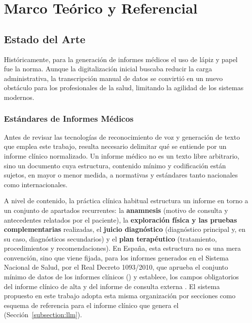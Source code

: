 \chapter{Marco Teórico y Referencial}\label{chapter:marco_teorico_y_referencial}

\section{Estado del Arte}

Históricamente, para la generación de informes médicos el uso de lápiz y papel fue la norma.
Aunque la digitalización inicial buscaba reducir la carga administrativa,
la transcripción manual de datos se convirtió en un nuevo obstáculo para los profesionales de la salud,
limitando la agilidad de los sistemas modernos.

\subsection{Estándares de Informes Médicos}\label{subsection:estandares_informes_medicos}

Antes de revisar las tecnologías de reconocimiento de voz y generación de texto que emplea este
trabajo, resulta necesario delimitar qué se entiende por un informe clínico normalizado.
Un informe médico no es un texto libre arbitrario, sino un documento cuya estructura, contenido
mínimo y codificación están sujetos, en mayor o menor medida, a normativas y estándares tanto
nacionales como internacionales.

A nivel de contenido, la práctica clínica habitual estructura un informe en torno a un conjunto de
apartados recurrentes: la \textbf{anamnesis} (motivo de consulta y antecedentes relatados por el
paciente), la \textbf{exploración física y las pruebas complementarias} realizadas, el
\textbf{juicio diagnóstico} (diagnóstico principal y, en su caso, diagnósticos secundarios) y el
\textbf{plan terapéutico} (tratamiento, procedimientos y recomendaciones). En España, esta
estructura no es una mera convención, sino que viene fijada, para los informes generados en el
Sistema Nacional de Salud, por el Real Decreto 1093/2010, que aprueba el conjunto mínimo de datos
de los informes clínicos () y establece, los campos obligatorios
del informe clínico de alta y del informe de consulta externa . El sistema
propuesto en este trabajo adopta esta misma organización por secciones como esquema de referencia
para el informe clínico que genera el  (Sección~\ref{subsection:llm}).

